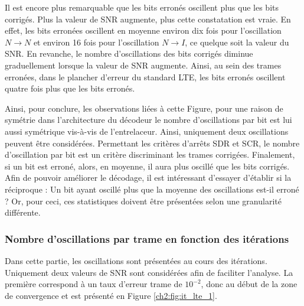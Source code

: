 Il est encore plus remarquable que les bits erronés 
oscillent plus que les bits corrigés. Plus la valeur de SNR augmente, plus cette constatation est vraie. En effet, les 
bits erronées oscillent en moyenne environ dix fois pour l'oscillation $N\rightarrow N$ et environ 16 fois pour 
l'oscillation $N\rightarrow I$, ce quelque soit la valeur du SNR. En revanche, le nombre d'oscillations des bits corrigés 
diminue graduellement lorsque la valeur de SNR augmente. Ainsi, au sein des trames erronées, dans le plancher d'erreur 
du standard LTE, les bits erronés oscillent quatre fois plus que les bits erronés.

Ainsi, pour conclure, les observations liées à cette Figure, pour une raison de symétrie dans l'architecture du décodeur 
le nombre d'oscillations par bit est lui aussi symétrique vis-à-vis de l'entrelaceur. Ainsi, uniquement deux 
oscillations peuvent être considérées. Permettant les critères d'arrêts SDR et SCR, le nombre d’oscillation par bit est 
un critère discriminant les trames corrigées. Finalement, si un bit est erroné, alors, en moyenne, il aura plus oscillé 
que les bits corrigés. Afin de pouvoir améliorer le décodage, il est intéressant d'essayer d'établir si la réciproque : 
\og Un bit ayant oscillé plus que la moyenne des oscillations est-il erroné ? \fg Or, pour ceci, ces statistiques doivent
être présentées selon une granularité différente.

\subsubsection{Nombre d'oscillations par trame en fonction des itérations} 
Dans cette partie, les oscillations sont présentées au cours des itérations. Uniquement deux valeurs de SNR sont 
considérées afin de faciliter l'analyse. La première correspond à un taux d'erreur trame de $10^{-2}$, donc au début de 
la zone de convergence et est présenté en Figure \ref{ch2:fig:it_lte_1}.

